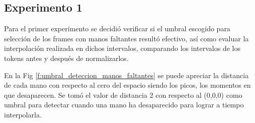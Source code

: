 \subsection{Experimento 1}
Para el primer experimento se decidió verificar si el umbral escogido para selección de los frames con manos faltantes resultó efectivo, así como evaluar la interpolación realizada en dichos intervalos, comparando los intervalos de los tokens antes y después de normalizarlos.

En la Fig \ref{f:umbral_deteccion_manos_faltantes} se puede apreciar la distancia de cada mano con respecto al cero del espacio siendo los picos, los momentos en que desaparecen. Se tomó el valor de distancia 2 con respecto al (0,0,0) como umbral para detectar cuando una mano ha desaparecido para lograr a tiempo interpolarla.

